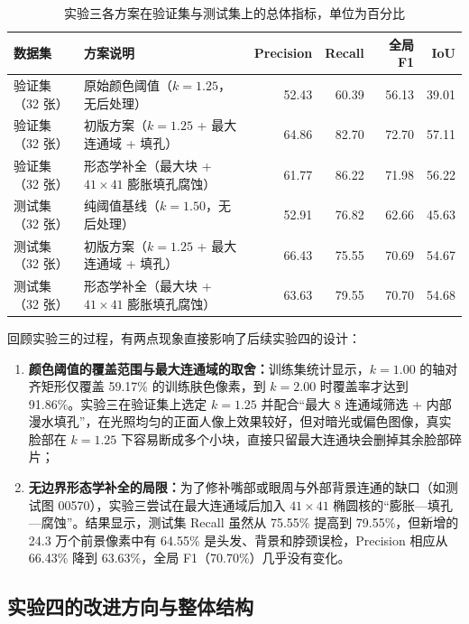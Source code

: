 \begin{table}[H]
\centering\footnotesize
\setlength{\tabcolsep}{4.5pt}
\caption{实验三各方案在验证集与测试集上的总体指标，单位为百分比}\label{tab:lab3_summary}
\begin{tabular}{llrrrr}
\toprule
数据集 & 方案说明 & Precision & Recall & 全局 F1 & IoU \\
\midrule
验证集（32 张） & 原始颜色阈值（$k=1.25$，无后处理） & 52.43 & 60.39 & 56.13 & 39.01 \\
验证集（32 张） & 初版方案（$k=1.25$ + 最大连通域 + 填孔） & 64.86 & 82.70 & 72.70 & 57.11 \\
验证集（32 张） & 形态学补全（最大块 + $41\times41$ 膨胀填孔腐蚀） & 61.77 & 86.22 & 71.98 & 56.22 \\
\midrule
测试集（32 张） & 纯阈值基线（$k=1.50$，无后处理） & 52.91 & 76.82 & 62.66 & 45.63 \\
测试集（32 张） & 初版方案（$k=1.25$ + 最大连通域 + 填孔） & 66.43 & 75.55 & 70.69 & 54.67 \\
测试集（32 张） & 形态学补全（最大块 + $41\times41$ 膨胀填孔腐蚀） & 63.63 & 79.55 & 70.70 & 54.68 \\
\bottomrule
\end{tabular}
\end{table}

回顾实验三的过程，有两点现象直接影响了后续实验四的设计：
\begin{enumerate}
\item \textbf{颜色阈值的覆盖范围与最大连通域的取舍：}训练集统计显示，$k=1.00$ 的轴对齐矩形仅覆盖 59.17\% 的训练肤色像素，到 $k=2.00$ 时覆盖率才达到 91.86\%。实验三在验证集上选定 $k=1.25$ 并配合“最大 8 连通域筛选 + 内部漫水填孔”，在光照均匀的正面人像上效果较好，但对暗光或偏色图像，真实脸部在 $k=1.25$ 下容易断成多个小块，直接只留最大连通块会删掉其余脸部碎片；
\item \textbf{无边界形态学补全的局限：}为了修补嘴部或眼周与外部背景连通的缺口（如测试图 00570），实验三尝试在最大连通域后加入 $41\times41$ 椭圆核的“膨胀—填孔—腐蚀”。结果显示，测试集 Recall 虽然从 75.55\% 提高到 79.55\%，但新增的 24.3 万个前景像素中有 64.55\% 是头发、背景和脖颈误检，Precision 相应从 66.43\% 降到 63.63\%，全局 F1（70.70\%）几乎没有变化。
\end{enumerate}

\subsection{实验四的改进方向与整体结构}

